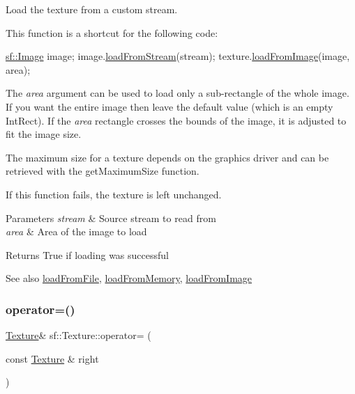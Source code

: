 Load the texture from a custom stream. 

This function is a shortcut for the following code\+: 
\begin{DoxyCode}
\hyperlink{classsf_1_1_image}{sf::Image} image;
image.\hyperlink{classsf_1_1_image_a21122ded0e8368bb06ed3b9acfbfb501}{loadFromStream}(stream);
texture.\hyperlink{classsf_1_1_texture_abec4567ad9856a3596dc74803f26fba2}{loadFromImage}(image, area);
\end{DoxyCode}


The {\itshape area} argument can be used to load only a sub-\/rectangle of the whole image. If you want the entire image then leave the default value (which is an empty Int\+Rect). If the {\itshape area} rectangle crosses the bounds of the image, it is adjusted to fit the image size.

The maximum size for a texture depends on the graphics driver and can be retrieved with the get\+Maximum\+Size function.

If this function fails, the texture is left unchanged.


\begin{DoxyParams}{Parameters}
{\em stream} & Source stream to read from \\
\hline
{\em area} & Area of the image to load\\
\hline
\end{DoxyParams}
\begin{DoxyReturn}{Returns}
True if loading was successful
\end{DoxyReturn}
\begin{DoxySeeAlso}{See also}
\hyperlink{classsf_1_1_texture_a8e1b56eabfe33e2e0e1cb03712c7fcc7}{load\+From\+File}, \hyperlink{classsf_1_1_texture_a2c4adb19dd4cbee0a588eeb85e52a249}{load\+From\+Memory}, \hyperlink{classsf_1_1_texture_abec4567ad9856a3596dc74803f26fba2}{load\+From\+Image} 
\end{DoxySeeAlso}
\mbox{\label{classsf_1_1_texture_a80a089b6b19bb09b83012d5f0e6af9ba}} 
\subsubsection{\texorpdfstring{operator=()}{operator=()}}
{\footnotesize\ttfamily \hyperlink{classsf_1_1_texture}{Texture}\& sf\+::\+Texture\+::operator= (\begin{DoxyParamCaption}\item[{const \hyperlink{classsf_1_1_texture}{Texture} \&}]{right }\end{DoxyParamCaption})}



